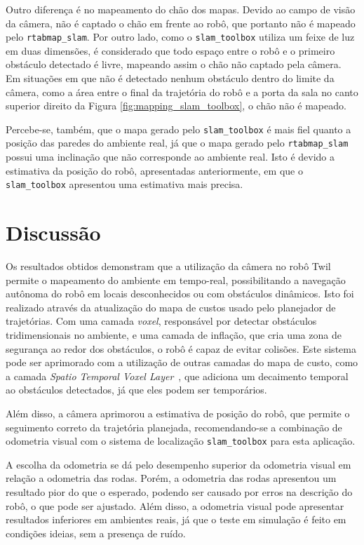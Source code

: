 \documentclass[repeatfields,xlists,xpacks,oneside,yearsonly]{ufrgscca}
\begin{document}
Outro diferença é no mapeamento do chão dos mapas. Devido ao campo de
visão da câmera, não é captado o chão em frente ao robô, que portanto
não é mapeado pelo \texttt{rtabmap\_slam}. Por outro lado, como o
\texttt{slam\_toolbox} utiliza um feixe de luz em duas dimensões, é
considerado que todo espaço entre o robô e o primeiro obstáculo
detectado é livre, mapeando assim o chão não captado pela câmera. Em
situações em que não é detectado nenhum obstáculo dentro do limite da
câmera, como a área entre o final da trajetória do robô e a porta da
sala no canto superior direito da Figura
\ref{fig:mapping_slam_toolbox}, o chão não é mapeado.

Percebe-se, também, que o mapa gerado pelo \texttt{slam\_toolbox} é
mais fiel quanto a posição das paredes do ambiente real, já que o
mapa gerado pelo \texttt{rtabmap\_slam} possui uma inclinação que não
corresponde ao ambiente real. Isto é devido a estimativa da posição
do robô, apresentadas anteriormente, em que o \texttt{slam\_toolbox}
apresentou uma estimativa mais precisa.

\chapter{Discussão}
\label{discussao}

Os resultados obtidos demonstram que a utilização da câmera no robô
Twil permite o mapeamento do ambiente em tempo-real, possibilitando a
navegação autônoma do robô em locais desconhecidos ou com obstáculos
dinâmicos. Isto foi realizado através da atualização do mapa de
custos usado pelo planejador de trajetórias. Com uma camada
\textit{voxel}, responsável por detectar obstáculos tridimensionais
no ambiente, e uma camada de inflação, que cria uma zona de segurança
ao redor dos obstáculos, o robô é capaz de evitar colisões. Este
sistema pode ser aprimorado com a utilização de outras camadas do
mapa de custo, como a camada \textit{Spatio Temporal Voxel
    Layer}~\cite{stlv_article}, que adiciona um decaimento temporal ao
obstáculos detectados, já que eles podem ser temporários.

Além disso, a câmera aprimorou a estimativa de posição do robô, que
permite o seguimento correto da trajetória planejada, recomendando-se
a combinação de odometria visual com o sistema de localização
\texttt{slam\_toolbox} para esta aplicação.

A escolha da odometria se dá pelo desempenho superior da odometria
visual em relação a odometria das rodas. Porém, a odometria das rodas
apresentou um resultado pior do que o esperado, podendo ser causado
por erros na descrição do robô, o que pode ser ajustado. Além disso,
a odometria visual pode apresentar resultados inferiores em ambientes
reais, já que o teste em simulação é feito em condições ideias, sem a
presença de ruído.
\end{document}
